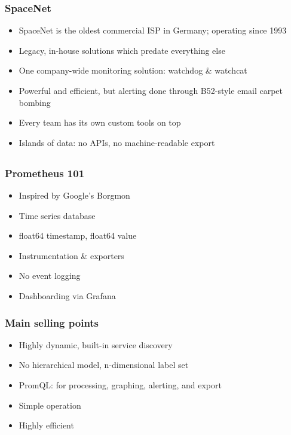 \documentclass[t]{beamer}
\begin{document}
\begin{frame}
	\frametitle{SpaceNet}
	\begin{itemize}
		\item SpaceNet is the oldest commercial ISP in Germany; operating since 1993
		\item Legacy, in-house solutions which predate everything else
		\item One company-wide monitoring solution: watchdog \& watchcat
		\item Powerful and efficient, but alerting done through B52-style email carpet bombing
		\item Every team has its own custom tools on top
		\item Islands of data: no APIs, no machine-readable export
	\end{itemize}
\end{frame}

\subsection{}




\begin{frame}
	\frametitle{Prometheus 101}
	\begin{itemize}
		\item Inspired by Google's Borgmon
		\item Time series database
		\item float64 timestamp, float64 value
		\item Instrumentation \& exporters
		\item No event logging
		\item Dashboarding via Grafana
	\end{itemize}
\end{frame}

\begin{frame}
	\frametitle{Main selling points}
	\begin{itemize}
		\item Highly dynamic, built-in service discovery
		\item No hierarchical model, n-dimensional label set
		\item PromQL: for processing, graphing, alerting, and export
		\item Simple operation
		\item Highly efficient
	\end{itemize}
\end{frame}
\end{document}
